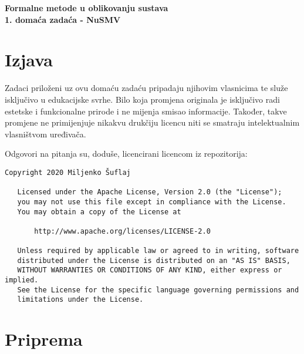\documentclass{article}
\begin{document}
\begin{titlepage}
    \centering
    \vspace*{\fill}

    \vspace*{0.5cm}

    \huge\bfseries
    Formalne metode u oblikovanju sustava \\
    \vspace*{0.5cm}
    \large 1. domaća zadaća - NuSMV

    \vspace*{\fill}
\end{titlepage}

\tableofcontents
\pagebreak



\section{Izjava}

Zadaci priloženi uz ovu domaću zadaću pripadaju njihovim vlasnicima te služe isključivo u edukacijske svrhe. Bilo koja promjena originala je isključivo radi estetske i funkcionalne prirode i ne mijenja smisao informacije. Također, takve promjene ne primijenjuje nikakvu drukčiju licencu niti se smatraju intelektualnim vlasništvom uređivača.
\newline

Odgovori na pitanja su, doduše, licencirani licencom iz repozitorija:

\begin{verbatim}
Copyright 2020 Miljenko Šuflaj

   Licensed under the Apache License, Version 2.0 (the "License");
   you may not use this file except in compliance with the License.
   You may obtain a copy of the License at

       http://www.apache.org/licenses/LICENSE-2.0

   Unless required by applicable law or agreed to in writing, software
   distributed under the License is distributed on an "AS IS" BASIS,
   WITHOUT WARRANTIES OR CONDITIONS OF ANY KIND, either express or implied.
   See the License for the specific language governing permissions and
   limitations under the License.
\end{verbatim}


\section{Priprema}
\end{document}
